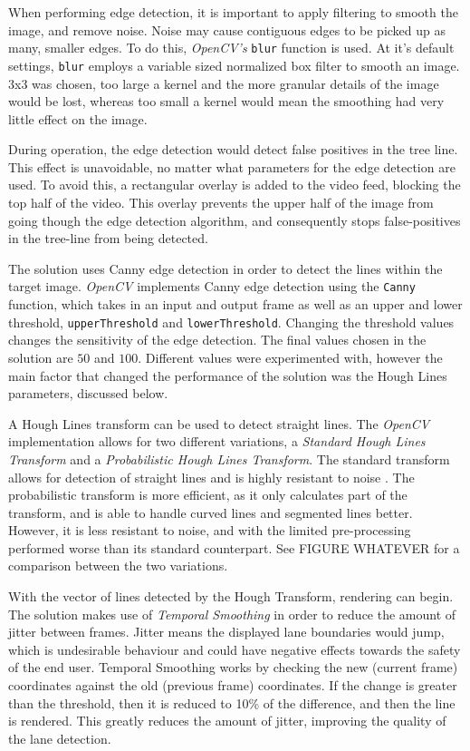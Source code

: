 \documentclass[conference]{IEEEtran}
\begin{document}
When performing edge detection, it is important to apply filtering to smooth the image, and remove noise. Noise may cause contiguous edges to be picked up as many, smaller edges.  To do this, \textit{OpenCV's} \verb|blur| function is used. At it's default settings, \verb|blur| employs a variable sized normalized box filter to smooth an image\cite{BlurDocs}. $3$x$3$ was chosen, too large a kernel and the more granular details of the image would be lost, whereas too small a kernel would mean the smoothing had very little effect on the image.

During operation, the edge detection would detect false positives in the tree line. This effect is unavoidable, no matter what parameters for the edge detection are used. To avoid this, a rectangular overlay is added to the video feed, blocking the top half of the video. This overlay prevents the upper half of the image from going though the edge detection algorithm, and consequently stops false-positives in the tree-line from being detected.

The solution uses Canny edge detection in order to detect the lines within the target image. \textit{OpenCV} implements Canny edge detection using the \verb|Canny| function\cite{8265710}, which takes in an input and output frame as well as an upper and lower threshold, \verb|upperThreshold| and \verb|lowerThreshold|. Changing the threshold values changes the sensitivity of the edge detection. The final values chosen in the solution are $50$ and $100$. Different values were experimented with, however the main factor that changed the performance of the solution was the Hough Lines parameters, discussed below. 

A Hough Lines transform can be used to detect straight lines. The \textit{OpenCV} implementation allows for two different variations, a \textit{Standard Hough Lines Transform} and a \textit{Probabilistic Hough Lines Transform}. The standard transform allows for detection of straight lines and is highly resistant to noise \cite{4608701}. The probabilistic transform is more efficient, as it only calculates part of the transform, and is able to handle curved lines and segmented lines better. However, it is less resistant to noise, and with the limited pre-processing performed worse than its standard counterpart. See FIGURE WHATEVER for a comparison between the two variations. 

With the vector of lines detected by the Hough Transform, rendering can begin. The solution makes use of \textit{Temporal Smoothing}\cite{TemporalSmoothing} in order to reduce the amount of jitter between frames. Jitter means the displayed lane boundaries would jump, which is undesirable behaviour and could have negative effects towards the safety of the end user. Temporal Smoothing works by checking the new (current frame) coordinates against the old (previous frame) coordinates. If the change is greater than the threshold, then it is reduced to 10\% of the difference, and then the line is rendered. This greatly reduces the amount of jitter, improving the quality of the lane detection. 
\end{document}
